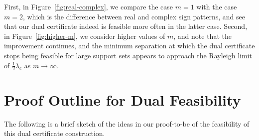 \documentclass[11pt]{article}
\begin{document}
First, in Figure~\ref{fig:real-complex}, we compare the case $m = 1$ with the case $m = 2$, which is the difference between real and complex sign patterns, and see that our dual certificate indeed is feasible more often in the latter case.
Second, in Figure~\ref{fig:higher-m}, we consider higher values of $m$, and note that the improvement continues, and the minimum separation at which the dual certificate stops being feasible for large support sets appears to approach the Rayleigh limit of $\frac{1}{2}\lambda_c$ as $m \to \infty$.

\section{Proof Outline for Dual Feasibility}

The following is a brief sketch of the ideas in our proof-to-be of the feasibility of this dual certificate construction.
\end{document}
